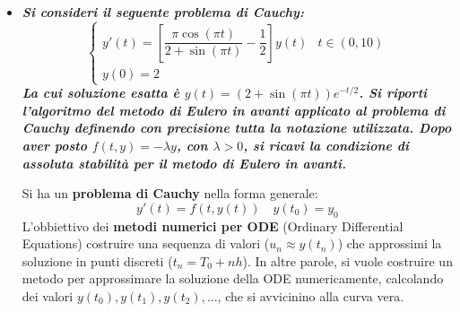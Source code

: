 \begin{itemize}
\begin{takeawaysbox}
\begin{itemize}
\begin{enumerate}
\begin{itemize}
\begin{equation*}
                    \end{equation*}
                \end{itemize}
                La dipendenza dall'ampiezza massimo $H$ mostra che \textbf{raffinando la partizione} (riducendo $H$), l'errore decresce. L'\textbf{ordine di convergenza} \eaccent $k+1$: se si usa un polinomio lineare ($k=1$), l'errore decresce come $H^{2}$ ($\mathcal{O}(H^{2})$); se si usa un polinomio quadratico ($k=2$), l'errore decresce come $H^{3}$ ($\mathcal{O}(H^{3})$), e cos\iaccent via. Infine, la costante $C_{k}$ dipende solo da come sono scelti i nodi (es. equispaziati, Chebyshev, etc.), ovvero dal grado e dalla posizione dei nodi, non da $H$.
                
                In altre parole, dall'ultima equazione, ne consegue che l'interpolante di Lagrange composito converge alla funzione originale al crescere della finezza della partizione (ovvero al diminuire di $H$), con un ordine di convergenza che dipende dal grado del polinomio usato in ogni sottointervallo.
            \end{enumerate}
        \end{itemize}
    \end{takeawaysbox}


    \item \textcolor{Red2}{\textbf{\emph{Si consideri il seguente problema di Cauchy:
    \begin{equation*}
        \begin{cases}
            y'(t) = \left[\dfrac{\pi \cos\left(\pi t\right)}{2 + \sin\left(\pi t\right)} - \dfrac{1}{2}\right] y(t) & t \in \left(0, 10\right) \\[1em]
            y(0) = 2
        \end{cases}
    \end{equation*}
    La cui soluzione esatta è $y(t) = \left(2 + \sin\left(\pi t\right)\right) e^{- t/2}$. Si riporti l'algoritmo del metodo di Eulero in avanti applicato al problema di Cauchy definendo con precisione tutta la notazione utilizzata. Dopo aver posto $f(t, y) = -\lambda y$, con $\lambda > 0$, si ricavi la condizione di assoluta stabilità per il metodo di Eulero in avanti.}}}

     Si ha un \textbf{problema di Cauchy} nella forma generale:
    \begin{equation*}
        y'(t) = f(t, y(t)) \quad y(t_0) = y_0
    \end{equation*}
    L'obbiettivo dei \textbf{metodi numerici per ODE} (Ordinary Differential Equations) \eaccent costruire una sequenza di valori ($u_n \approx y(t_n)$) che approssimi la soluzione in punti discreti ($t_n = T_0 + n h$). In altre parole, si vuole costruire un metodo per approssimare la soluzione della ODE numericamente, calcolando dei valori $y(t_0), y(t_1), y(t_2), \dots$, che si avvicinino alla curva vera.


\end{itemize}
